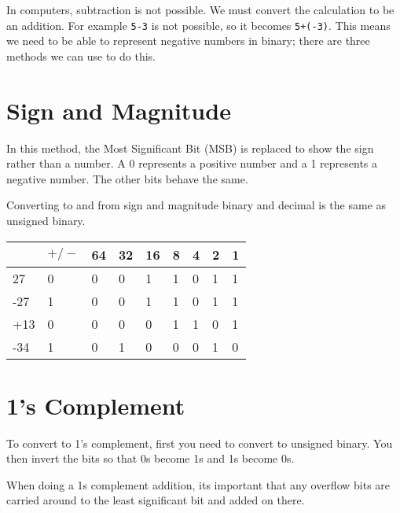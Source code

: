In computers, subtraction is not possible. We must convert the calculation to be an addition. For example \verb|5-3| is not possible, so it becomes \verb|5+(-3)|. This means we need to be able to represent negative numbers in binary; there are three methods we can use to do this.

\section*{Sign and Magnitude}
In this method, the Most Significant Bit (MSB) is replaced to show the sign rather than a number. A 0 represents a positive number and a 1 represents a negative number. The other bits behave the same.

Converting to and from sign and magnitude binary and decimal is the same as unsigned binary.

\begin{table}[H]
    \centering
    \begin{tabularx}{0.7\textwidth}{X|XXXXXXXX}
         & $+/-$ & 64 & 32 & 16 & 8 & 4 & 2 & 1\\
         \hline
        27 & 0 & 0 & 0 & 1 & 1 & 0 & 1 & 1\\
        -27 & 1 & 0 & 0 & 1 & 1 & 0 & 1 & 1\\
        +13 & 0 & 0 & 0 & 0 & 1 & 1 & 0 & 1 \\
        -34 & 1 & 0 & 1 & 0 & 0 & 0 & 1 & 0        
    \end{tabularx}
\end{table}


\section*{1's Complement}
To convert to 1's complement, first you need to convert to unsigned binary. You then invert the bits so that 0s become 1s and 1s become 0s.

When doing a 1s complement addition, its important that any overflow bits are carried around to the least significant bit and added on there.

